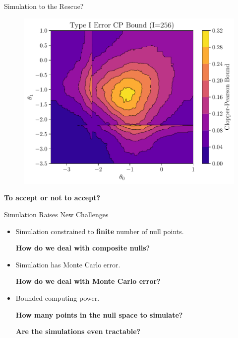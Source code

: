 \begin{frame}{Simulation to the Rescue?}
\begin{figure}
    \centering
    \includegraphics[width=0.9\linewidth]{figs/introduction_rescue_4.pdf}
\end{figure}
\begin{center}
    \textbf{To accept or not to accept?}
\end{center}
\end{frame}

\begin{frame}{Simulation Raises New Challenges}
\begin{itemize}
    \item Simulation constrained to \textbf{finite} number of null points.
    \begin{center}
        \textbf{How do we deal with composite nulls?}
    \end{center}
    \item Simulation has Monte Carlo error. 
    \begin{center}
        \textbf{How do we deal with Monte Carlo error?}
    \end{center}
    \item Bounded computing power.
    \begin{center}
        \textbf{How many points in the null space to simulate?}
    \end{center}
    \begin{center}
        \textbf{Are the simulations even tractable?}
    \end{center}
\end{itemize}
\end{frame}

